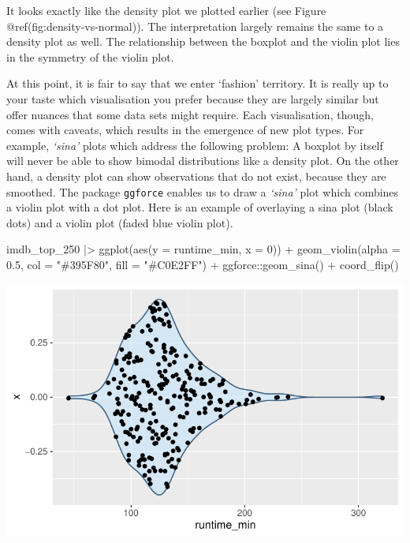 \documentclass[
  letterpaper,
]{krantz}
\makeatletter
\newenvironment{Shaded}{\begin{snugshade}}{\end{snugshade}}
\newcommand{\AttributeTok}[1]{\textcolor[rgb]{0.40,0.45,0.13}{#1}}
\newcommand{\DecValTok}[1]{\textcolor[rgb]{0.68,0.00,0.00}{#1}}
\newcommand{\FloatTok}[1]{\textcolor[rgb]{0.68,0.00,0.00}{#1}}
\newcommand{\FunctionTok}[1]{\textcolor[rgb]{0.28,0.35,0.67}{#1}}
\newcommand{\NormalTok}[1]{\textcolor[rgb]{0.00,0.23,0.31}{#1}}
\newcommand{\SpecialCharTok}[1]{\textcolor[rgb]{0.37,0.37,0.37}{#1}}
\newcommand{\StringTok}[1]{\textcolor[rgb]{0.13,0.47,0.30}{#1}}
\newenvironment{kframe}{%
\medskip{}
\setlength{\fboxsep}{.8em}
 \def\at@end@of@kframe{}%
 \ifinner\ifhmode%
  \def\at@end@of@kframe{\end{minipage}}%
  \begin{minipage}{\columnwidth}%
 \fi\fi%
 \def\FrameCommand##1{\hskip\@totalleftmargin \hskip-\fboxsep
 \colorbox{shadecolor}{##1}\hskip-\fboxsep
     \hskip-\linewidth \hskip-\@totalleftmargin \hskip\columnwidth}%
 \MakeFramed {\advance\hsize-\width
   \@totalleftmargin\z@ \linewidth\hsize
   \@setminipage}}%
 {\par\unskip\endMakeFramed%
 \at@end@of@kframe}
\renewenvironment{Shaded}{\begin{kframe}}{\end{kframe}}
\makeatother
\begin{document}
It looks exactly like the density plot we plotted earlier (see Figure
@ref(fig:density-vs-normal)). The interpretation largely remains the
same to a density plot as well. The relationship between the boxplot and
the violin plot lies in the symmetry of the violin plot.

At this point, it is fair to say that we enter `fashion' territory. It
is really up to your taste which visualisation you prefer because they
are largely similar but offer nuances that some data sets might require.
Each visualisation, though, comes with caveats, which results in the
emergence of new plot types. For example, \emph{`sina'} plots which
address the following problem: A boxplot by itself will never be able to
show bimodal distributions like a density plot. On the other hand, a
density plot can show observations that do not exist, because they are
smoothed. The package \texttt{ggforce} enables us to draw a
\emph{`sina'} plot which combines a violin plot with a dot plot. Here is
an example of overlaying a sina plot (black dots) and a violin plot
(faded blue violin plot).

\begin{Shaded}
\begin{Highlighting}[]
\NormalTok{imdb\_top\_250 }\SpecialCharTok{|\textgreater{}}
  \FunctionTok{ggplot}\NormalTok{(}\FunctionTok{aes}\NormalTok{(}\AttributeTok{y =}\NormalTok{ runtime\_min, }\AttributeTok{x =} \DecValTok{0}\NormalTok{)) }\SpecialCharTok{+}
  \FunctionTok{geom\_violin}\NormalTok{(}\AttributeTok{alpha =} \FloatTok{0.5}\NormalTok{, }\AttributeTok{col =} \StringTok{"\#395F80"}\NormalTok{, }\AttributeTok{fill =} \StringTok{"\#C0E2FF"}\NormalTok{) }\SpecialCharTok{+}
\NormalTok{  ggforce}\SpecialCharTok{::}\FunctionTok{geom\_sina}\NormalTok{() }\SpecialCharTok{+}
  \FunctionTok{coord\_flip}\NormalTok{()}
\end{Highlighting}
\end{Shaded}

\includegraphics{08_descriptive_statistics_files/figure-pdf/sina-plots-1.pdf}
\end{document}
